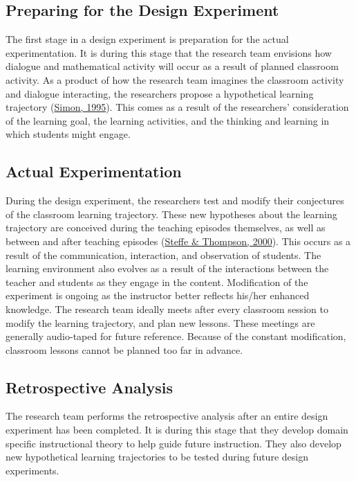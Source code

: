 \documentclass[11pt]{umnthesis}
\begin{document}
\hypertarget{preparing-for-the-design-experiment}{%
\subsection{Preparing for the Design Experiment}\label{preparing-for-the-design-experiment}}

The first stage in a design experiment is preparation for the actual experimentation. It is during this stage that the research team envisions how dialogue and mathematical activity will occur as a result of planned classroom activity. As a product of how the research team imagines the classroom activity and dialogue interacting, the researchers propose a hypothetical learning trajectory (\protect\hyperlink{ref-simon:1995}{Simon, 1995}). This comes as a result of the researchers' consideration of the learning goal, the learning activities, and the thinking and learning in which students might engage.

\hypertarget{actual-experimentation}{%
\subsection{Actual Experimentation}\label{actual-experimentation}}

During the design experiment, the researchers test and modify their conjectures of the classroom learning trajectory. These new hypotheses about the learning trajectory are conceived during the teaching episodes themselves, as well as between and after teaching episodes (\protect\hyperlink{ref-steffe:2000}{Steffe \& Thompson, 2000}). This occurs as a result of the communication, interaction, and observation of students. The learning environment also evolves as a result of the interactions between the teacher and students as they engage in the content. Modification of the experiment is ongoing as the instructor better reflects his/her enhanced knowledge. The research team ideally meets after every classroom session to modify the learning trajectory, and plan new lessons. These meetings are generally audio-taped for future reference. Because of the constant modification, classroom lessons cannot be planned too far in advance.

\hypertarget{retrospective-analysis}{%
\subsection{Retrospective Analysis}\label{retrospective-analysis}}

The research team performs the retrospective analysis after an entire design experiment has been completed. It is during this stage that they develop domain specific instructional theory to help guide future instruction. They also develop new hypothetical learning trajectories to be tested during future design experiments.
\end{document}
